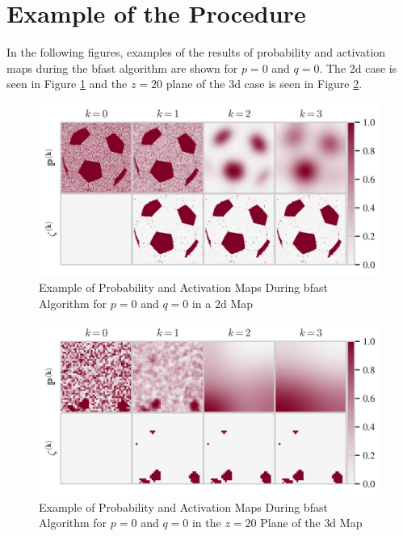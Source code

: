\newpage

\section{Example of the Procedure}

In the following figures, examples of the results of probability and activation maps during 
the \gls{bfast} algorithm are shown for $p=0$ and $q=0$. The \gls{2d} case is seen in 
Figure \ref{fig:bfastEx2D} and the $z=20$ plane of the \gls{3d} case is seen in 
Figure \ref{fig:bfastEx3D}.

\begin{figure}[htbp!]
\centering
\includegraphics{images/bfastEx2D.png}
\caption{Example of Probability and Activation Maps During \gls{bfast} Algorithm for $p=0$ and $q=0$ in a \gls{2d} Map}
\label{fig:bfastEx2D}
\end{figure}

\begin{figure}[htbp!]
\centering
\includegraphics{images/bfastEx3D.png}
\caption{Example of Probability and Activation Maps During \gls{bfast} Algorithm for $p=0$ and $q=0$ in the $z=20$ Plane of the \gls{3d} Map}
\label{fig:bfastEx3D}
\end{figure}

